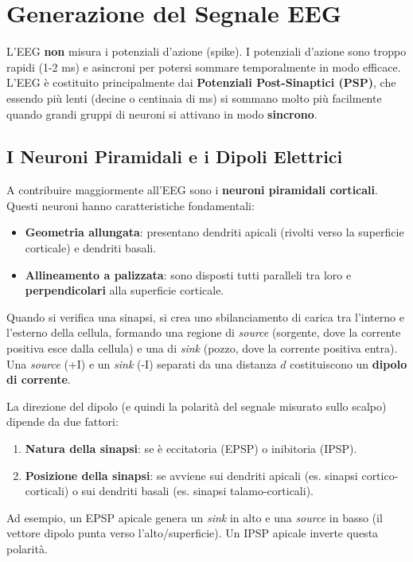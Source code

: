 \section{Generazione del Segnale EEG}
L'EEG \textbf{non} misura i potenziali d'azione (spike). I potenziali d'azione sono troppo rapidi (1-2 ms) e asincroni per potersi sommare temporalmente in modo efficace. L'EEG è costituito principalmente dai \textbf{Potenziali Post-Sinaptici (PSP)}, che essendo più lenti (decine o centinaia di ms) si sommano molto più facilmente quando grandi gruppi di neuroni si attivano in modo \textbf{sincrono}.

\subsection{I Neuroni Piramidali e i Dipoli Elettrici}
A contribuire maggiormente all'EEG sono i \textbf{neuroni piramidali corticali}. Questi neuroni hanno caratteristiche fondamentali:
\begin{itemize}
    \item \textbf{Geometria allungata}: presentano dendriti apicali (rivolti verso la superficie corticale) e dendriti basali.
    \item \textbf{Allineamento a palizzata}: sono disposti tutti paralleli tra loro e \textbf{perpendicolari} alla superficie corticale.
\end{itemize}

Quando si verifica una sinapsi, si crea uno sbilanciamento di carica tra l'interno e l'esterno della cellula, formando una regione di \textit{source} (sorgente, dove la corrente positiva esce dalla cellula) e una di \textit{sink} (pozzo, dove la corrente positiva entra). 
Una \textit{source} (+I) e un \textit{sink} (-I) separati da una distanza $d$ costituiscono un \textbf{dipolo di corrente}.

La direzione del dipolo (e quindi la polarità del segnale misurato sullo scalpo) dipende da due fattori:
\begin{enumerate}
    \item \textbf{Natura della sinapsi}: se è eccitatoria (EPSP) o inibitoria (IPSP).
    \item \textbf{Posizione della sinapsi}: se avviene sui dendriti apicali (es. sinapsi cortico-corticali) o sui dendriti basali (es. sinapsi talamo-corticali).
\end{enumerate}
Ad esempio, un EPSP apicale genera un \textit{sink} in alto e una \textit{source} in basso (il vettore dipolo punta verso l'alto/superficie). Un IPSP apicale inverte questa polarità.

